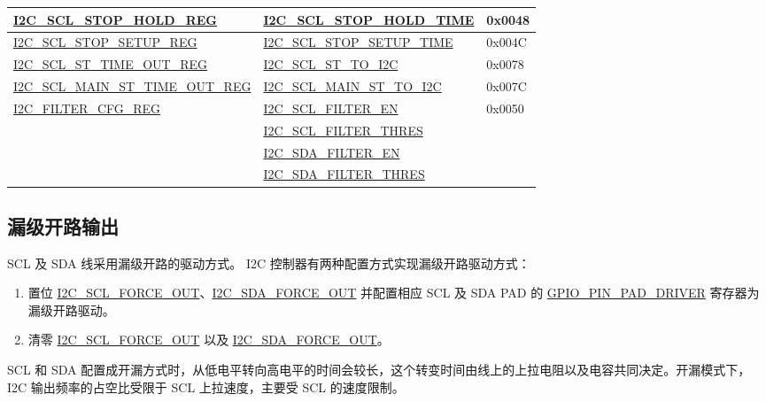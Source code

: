 \documentclass[main\_\_CN.tex]{subfiles}
\begin{document}
\begin{longtable}{ | p{6cm} | p{7cm} | p{2cm} | }
\hyperref[regdesc:I2CSCLSTOPHOLDREG]{I2C\_SCL\_STOP\_HOLD\_REG} & \hyperref[fielddesc:I2CSCLSTOPHOLDTIME]{I2C\_SCL\_STOP\_HOLD\_TIME} & 0x0048  \\ \hline
\hyperref[regdesc:I2CSCLSTOPSETUPREG]{I2C\_SCL\_STOP\_SETUP\_REG} & \hyperref[fielddesc:I2CSCLSTOPSETUPTIME]{I2C\_SCL\_STOP\_SETUP\_TIME} & 0x004C  \\ \hline

\hyperref[regdesc:I2CSCLSTTIMEOUTREG]{I2C\_SCL\_ST\_TIME\_OUT\_REG}& \hyperref[fielddesc:I2CSCLSTTOI2C]{I2C\_SCL\_ST\_TO\_I2C} & 0x0078\\ \hline
\hyperref[regdesc:I2CSCLMAINSTTIMEOUTREG]{I2C\_SCL\_MAIN\_ST\_TIME\_OUT\_REG}& \hyperref[fielddesc:I2CSCLMAINSTTOI2C]{I2C\_SCL\_MAIN\_ST\_TO\_I2C} & 0x007C\\ \hline


\hyperref[regdesc:I2CFILTERCFGREG]{I2C\_FILTER\_CFG\_REG} & {\hyperref[fielddesc:I2CSCLFILTEREN]{I2C\_SCL\_FILTER\_EN}} & 0x0050  \\\cline{2-2}
& {\hyperref[fielddesc:I2CSCLFILTERTHRES]{I2C\_SCL\_FILTER\_THRES}}& \\\cline{2-2}
& {\hyperref[fielddesc:I2CSDAFILTEREN]{I2C\_SDA\_FILTER\_EN}} &  \\\cline{2-2}
& {\hyperref[fielddesc:I2CSDAFILTERTHRES]{I2C\_SDA\_FILTER\_THRES}} & \\ \hline
\end{longtable}

\subsection{漏级开路输出}
SCL 及 SDA 线采用漏级开路的驱动方式。 I2C 控制器有两种配置方式实现漏级开路驱动方式：
\begin{enumerate}
\item 置位 \hyperref[fielddesc:I2CSCLFORCEOUT]{I2C\_SCL\_FORCE\_OUT}、\hyperref[fielddesc:I2CSDAFORCEOUT]{I2C\_SDA\_FORCE\_OUT} 并配置相应 SCL 及 SDA PAD 的 \hyperref[fielddesc:GPIOPINNPADDRIVER]{GPIO\_PIN\_PAD\_DRIVER} 寄存器为漏级开路驱动。
\item 清零 \hyperref[fielddesc:I2CSCLFORCEOUT]{I2C\_SCL\_FORCE\_OUT} 以及 \hyperref[fielddesc:I2CSDAFORCEOUT]{I2C\_SDA\_FORCE\_OUT}。
\end{enumerate}

SCL 和 SDA 配置成开漏方式时，从低电平转向高电平的时间会较长，这个转变时间由线上的上拉电阻以及电容共同决定。开漏模式下，I2C 输出频率的占空比受限于 SCL 上拉速度，主要受 SCL 的速度限制。
\end{document}
